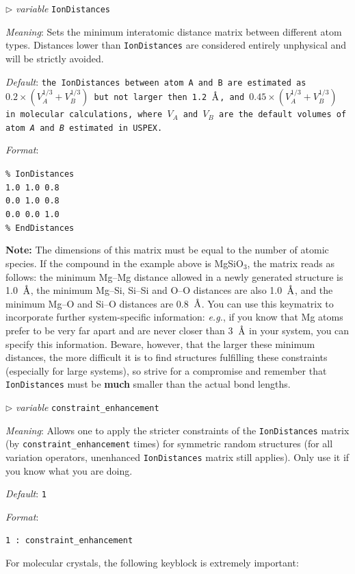 \documentclass[12pt]{article}
\newcommand{\keyword}[1]{\texttt{#1}}
\newcommand{\paramacro}[6]{
\vspace{0.5cm}
$\triangleright$ \emph{variable} {\color{blue} \texttt{#1}}

\emph{Meaning}: {#2}

{#3}

\emph{Default}: \texttt{#4}

\emph{Format}:

{\addtolength{\leftskip}{10mm} 
\texttt{#5}
\par}


{\small #6}

}
\begin{document}
\paramacro{IonDistances}{Sets the minimum interatomic distance matrix between
different atom types. Distances lower than \keyword{IonDistances} are considered
entirely unphysical and will be strictly avoided.}{} {\rm the
\keyword{IonDistances} between atom A and B are estimated as
$0.2\times(V_{A}^{1/3}+V_{B}^{1/3})$ but not larger then 1.2~$\text{\r{A}}$, and
$0.45\times(V_{A}^{1/3}+V_{B}^{1/3})$ in molecular calculations, where $V_A$ and
$V_B$ are the default volumes of atom \emph{A} and \emph{B} estimated in USPEX.
}{\% IonDistances\\
1.0 1.0 0.8 \\
0.0 1.0 0.8 \\
0.0 0.0 1.0 \\
\% EndDistances}{
\textbf{Note:} The dimensions of this matrix must be equal to the number of
atomic species. If the compound in the example above is MgSiO$_3$, the matrix
reads as follows: the minimum Mg--Mg distance allowed in a newly generated
structure is 1.0~$\text{\r{A}}$, the minimum Mg--Si, Si--Si and O--O distances
are also 1.0~$\text{\r{A}}$, and the minimum Mg--O and Si--O distances are
0.8~$\text{\r{A}}$. You can use this keymatrix to incorporate further
system-specific information: \emph{e.g.}, if you know that Mg atoms prefer to be
very far apart and are never closer than 3~$\text{\r{A}}$ in your system, you
can specify this information. Beware, however, that the larger these minimum
distances, the more difficult it is to find structures fulfilling these
constraints (especially for large systems), so strive for a compromise and
remember that \keyword{IonDistances} must be \textbf{much} smaller than the
actual bond lengths.
}


\paramacro{constraint\_enhancement}{Allows one to apply the stricter constraints
of the \keyword{IonDistances} matrix (by \keyword{constraint\_enhancement}
times) for symmetric random structures (for all variation operators, unenhanced
\keyword{IonDistances} matrix still applies). Only use it if you know what you
are doing.}{}{1}{1   :  constraint\_enhancement}{}

\vspace{0.5cm}

For molecular crystals, the following keyblock is extremely important:
\end{document}
